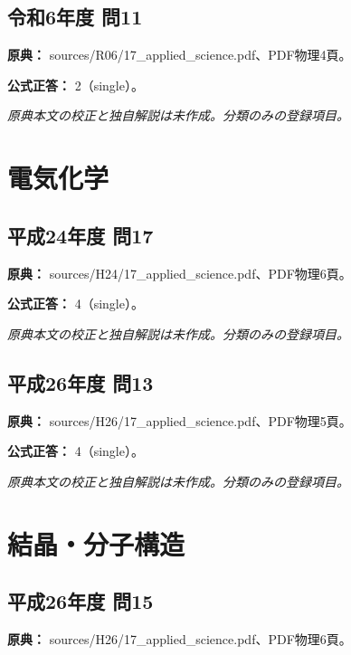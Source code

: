 \subsection{令和6年度 問11}
\label{q:r06-reg-applied-11}

\noindent\textbf{原典：} sources/R06/17\_applied\_science.pdf、PDF物理4頁。

\textbf{公式正答：} 2（single）。

\par\textit{原典本文の校正と独自解説は未作成。分類のみの登録項目。}

\section{電気化学}

\subsection{平成24年度 問17}
\label{q:h24-reg-applied-17}

\noindent\textbf{原典：} sources/H24/17\_applied\_science.pdf、PDF物理6頁。

\textbf{公式正答：} 4（single）。

\par\textit{原典本文の校正と独自解説は未作成。分類のみの登録項目。}

\subsection{平成26年度 問13}
\label{q:h26-reg-applied-13}

\noindent\textbf{原典：} sources/H26/17\_applied\_science.pdf、PDF物理5頁。

\textbf{公式正答：} 4（single）。

\par\textit{原典本文の校正と独自解説は未作成。分類のみの登録項目。}

\section{結晶・分子構造}

\subsection{平成26年度 問15}
\label{q:h26-reg-applied-15}

\noindent\textbf{原典：} sources/H26/17\_applied\_science.pdf、PDF物理6頁。

